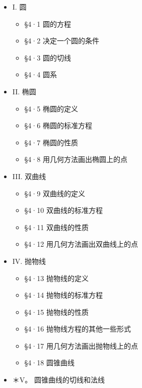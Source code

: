 \begin{itemize}
  \begin{itemize}
  \tightlist
  \item
    I. 圆

    \begin{itemize}
    \tightlist
    \item
      §4·1 圆的方程
    \item
      §4·2 决定一个圆的条件
    \item
      §4·3 圆的切线
    \item
      §4·4 圆系
    \end{itemize}
  \item
    II. 椭圆

    \begin{itemize}
    \tightlist
    \item
      §4·5 椭圆的定义
    \item
      §4·6 椭圆的标准方程
    \item
      §4·7 椭圆的性质
    \item
      §4·8 用几何方法画出椭圆上的点
    \end{itemize}
  \item
    III. 双曲线

    \begin{itemize}
    \tightlist
    \item
      §4·9 双曲线的定义
    \item
      §4·10 双曲线的标准方程
    \item
      §4·11 双曲线的性质
    \item
      §4·12 用几何方法画出双曲线上的点
    \end{itemize}
  \item
    IV. 抛物线

    \begin{itemize}
    \tightlist
    \item
      §4·13 抛物线的定义
    \item
      §4·14 抛物线的标准方程
    \item
      §4·15 抛物线的性质
    \item
      §4·16 抛物线方程的其他一些形式
    \item
      §4·17 用几何方法画出抛物线上的点
    \item
      §4·18 圆锥曲线
    \end{itemize}
  \item
    ＊V。 圆锥曲线的切线和法线


\end{itemize}
\end{itemize}
